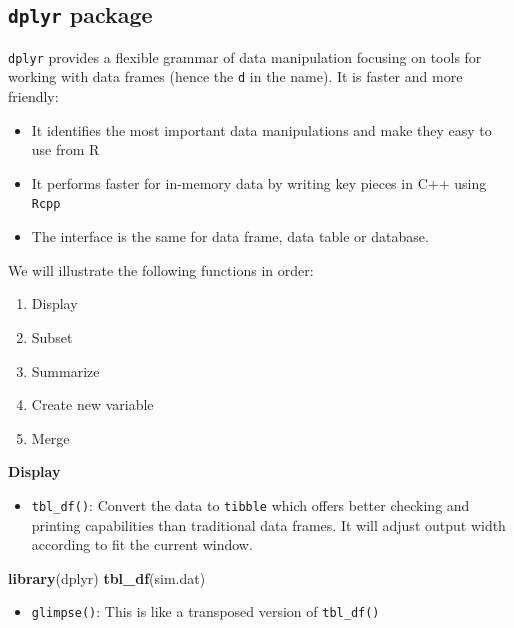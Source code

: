 \documentclass[12pt,]{krantz}
\newenvironment{Shaded}{\begin{snugshade}}{\end{snugshade}}
\newcommand{\KeywordTok}[1]{\textcolor[rgb]{0.13,0.29,0.53}{\textbf{#1}}}
\newcommand{\NormalTok}[1]{#1}
\providecommand{\tightlist}{%
  \setlength{\itemsep}{0pt}\setlength{\parskip}{0pt}}
\theoremstyle{definition}
\theoremstyle{definition}
\theoremstyle{definition}
\theoremstyle{remark}
\begin{document}
\subsection{\texorpdfstring{\texttt{dplyr}
package}{dplyr package}}\label{dplyr-package}

\texttt{dplyr} provides a flexible grammar of data manipulation focusing
on tools for working with data frames (hence the \texttt{d} in the
name). It is faster and more friendly:

\begin{itemize}
\tightlist
\item
  It identifies the most important data manipulations and make they easy
  to use from R
\item
  It performs faster for in-memory data by writing key pieces in C++
  using \texttt{Rcpp}
\item
  The interface is the same for data frame, data table or database.
\end{itemize}

We will illustrate the following functions in order:

\begin{enumerate}
\def\labelenumi{\arabic{enumi}.}
\tightlist
\item
  Display
\item
  Subset
\item
  Summarize
\item
  Create new variable
\item
  Merge
\end{enumerate}

\textbf{Display}

\begin{itemize}
\tightlist
\item
  \texttt{tbl\_df()}: Convert the data to \texttt{tibble} which offers
  better checking and printing capabilities than traditional data
  frames. It will adjust output width according to fit the current
  window.
\end{itemize}

\begin{Shaded}
\begin{Highlighting}[]
\KeywordTok{library}\NormalTok{(dplyr)}
\KeywordTok{tbl_df}\NormalTok{(sim.dat)}
\end{Highlighting}
\end{Shaded}

\begin{itemize}
\tightlist
\item
  \texttt{glimpse()}: This is like a transposed version of
  \texttt{tbl\_df()}
\end{itemize}
\end{document}
